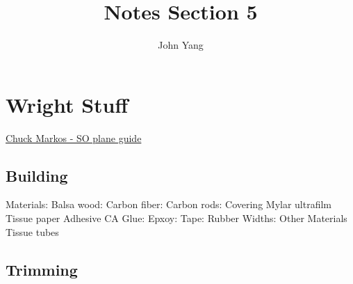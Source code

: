 \documentclass{article}
\title{Notes Section 5} %
\author{John Yang}
\begin{document}
    \maketitle
    \tableofcontents
    \section{Wright Stuff}
    \small \href{https://freeflight.org/wp-content/uploads/2016/02/2009ScienceOlympiadManual.pdf}{Chuck Markos - SO plane guide} \normalsize 
    \subsection{Building}
    \begin{outline}
        \1 Materials:
            \2 Balsa wood:
                \3
            \2 Carbon fiber:
                \3 
            \2 Carbon rods: 
                \3
            \2 Covering
                \3 Mylar ultrafilm
                \3 Tissue paper
            \2 Adhesive
                \3 CA Glue:
                \3 Epxoy:
                \3 Tape:
            \2 Rubber
                \3 Widths:
            \2 Other Materials
                \3 Tissue tubes
                \3 
    \end{outline}
    \subsection{Trimming}
    \begin{outline}
        \1 
    \end{outline}
\end{document}
